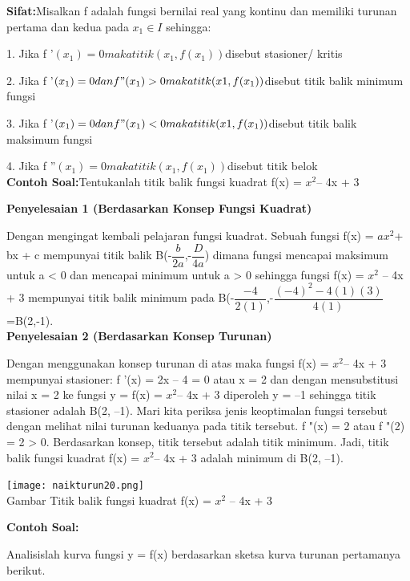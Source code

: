 \documentclass[11pt,fleqn]{book} %
\begin{document}
\textbf{Sifat:}Misalkan f adalah fungsi bernilai real yang kontinu
dan memiliki turunan pertama dan kedua pada $x_{1} \in I$
sehingga:

1. Jika f '$(x_{1}) = 0 maka titik (x_{1}, f(x_{1}))$disebut stasioner/
kritis

2. Jika f '$(x_{1}) = 0 dan f "(x_{1}) > 0 maka titk (x1, f(x_{1}))$disebut titik balik minimum fungsi

3. Jika f '$(x_{1}) = 0 dan f "(x_{1}) < 0 maka titik (x1, f(x_{1}))$disebut titik balik maksimum fungsi

4. Jika f ''$(x_{1}) = 0 maka titik (x_{1}, f(x_{1})) $disebut titik belok\\

\textbf{Contoh Soal:}Tentukanlah titik balik fungsi kuadrat f(x) = $x^{2} $– 4x + 3

\textbf{Penyelesaian 1 (Berdasarkan Konsep
Fungsi Kuadrat)}

Dengan mengingat kembali pelajaran fungsi kuadrat.
Sebuah fungsi f(x) = $ax^{2} $+ bx + c mempunyai titik balik B(-$\dfrac{b}{2a}$,-$\dfrac{D}{4a}$) dimana fungsi mencapai maksimum untuk a < 0 dan mencapai minimum untuk a > 0 sehingga fungsi
f(x) = $x^{2}$ – 4x + 3 mempunyai titik balik minimum pada B(-$\dfrac{-4}{2(1)}$,-$\dfrac{(-4)^{2}-4(1)(3)}{4(1)}$=B(2,-1).\\

\textbf{Penyelesaian 2 (Berdasarkan Konsep
Turunan)}

Dengan menggunakan konsep turunan di atas maka
fungsi f(x) = $x^{2} $– 4x + 3 mempunyai stasioner: f '(x) = 2x – 4 = 0 atau x = 2 dan dengan mensubstitusi nilai x = 2 ke fungsi y = f(x) = $x^{2} $– 4x + 3 diperoleh y = –1 sehingga titik stasioner adalah B(2, –1). Mari kita periksa jenis keoptimalan fungsi tersebut dengan melihat nilai turunan keduanya pada titik tersebut. f "(x) = 2 atau f "(2) = 2 > 0.
Berdasarkan konsep, titik tersebut adalah titik minimum. Jadi, titik balik fungsi kuadrat f(x) = $x^{2} $– 4x + 3 adalah minimum di B(2, –1).

\begin{center}
\texttt{[image: naikturun20.png]}\\
Gambar Titik balik fungsi kuadrat f(x) = $x^{2}$ – 4x + 3
\end{center}

\begin{flushleft}
\textbf{Contoh Soal:}

Analisislah kurva fungsi y = f(x) berdasarkan sketsa kurva
turunan pertamanya berikut.
\end{flushleft}
\end{document}
